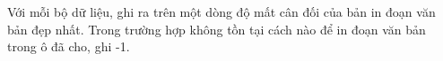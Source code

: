 Với mỗi bộ dữ liệu, ghi ra trên một dòng độ mất cân đối của bản in đoạn văn bản đẹp nhất. Trong trường hợp không tồn tại cách nào để in đoạn văn bản trong ô đã cho, ghi -1.  

\